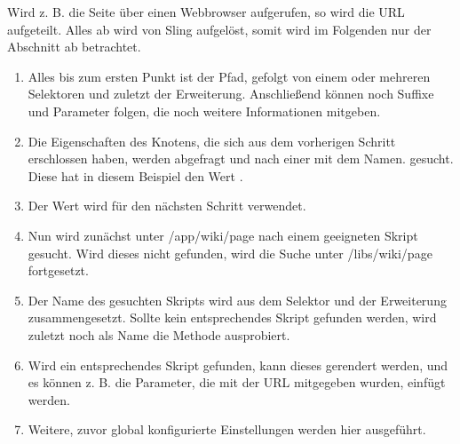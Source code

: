 Wird z. B. die Seite über einen Webbrowser  aufgerufen, so wird die URL aufgeteilt. Alles ab  wird von Sling aufgelöst, somit wird im Folgenden nur der Abschnitt ab  betrachtet.
\begin{enumerate}
	\item Alles bis zum ersten Punkt ist der Pfad, gefolgt von einem oder mehreren Selektoren und zuletzt der Erweiterung. Anschließend können noch Suffixe und Parameter folgen, die noch weitere Informationen mitgeben.
	\item Die Eigenschaften des Knotens, die sich aus dem vorherigen Schritt erschlossen haben, werden abgefragt und nach einer mit dem Namen.  gesucht. Diese hat in diesem Beispiel den Wert .
	\item Der Wert wird für den nächsten Schritt verwendet.
	\item Nun wird zunächst unter /app/wiki/page nach einem geeigneten Skript gesucht. Wird dieses nicht gefunden, wird die Suche unter /libs/wiki/page fortgesetzt.
	\item Der Name des gesuchten Skripts wird aus dem Selektor und der Erweiterung zusammengesetzt. Sollte kein entsprechendes Skript gefunden werden, wird zuletzt noch als Name die Methode ausprobiert.
	\item Wird ein entsprechendes Skript gefunden, kann dieses gerendert werden, und es können z. B. die Parameter, die mit der URL mitgegeben wurden, einfügt werden.
	\item Weitere, zuvor global konfigurierte Einstellungen werden hier ausgeführt.
\end{enumerate}